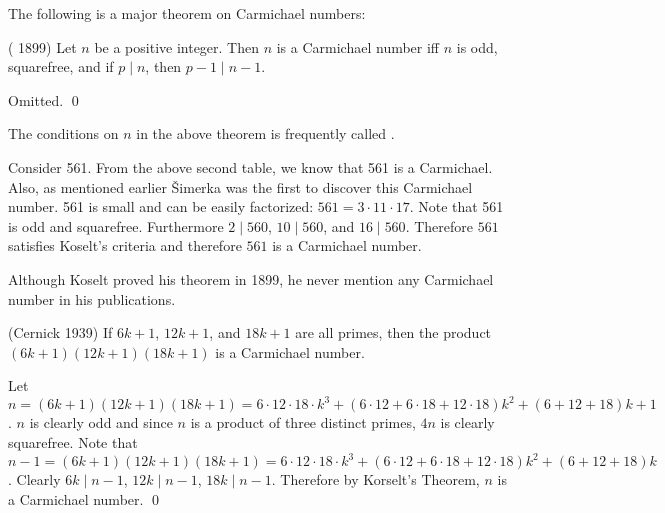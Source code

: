 



The following is a major theorem on Carmichael numbers:

\begin{thm} \textnormal{( 1899)}
  Let $n$ be a positive integer.
  Then $n$ is a Carmichael number iff $n$ is odd, squarefree, and
  if $p \mid n$, then $p-1 \mid n-1$.
\end{thm}
\proof
Omitted.
\qed

The conditions on $n$ in the above theorem is frequently called
.

\begin{eg}
Consider 561.
From the above second table, we know that 561 is a Carmichael.
Also, as mentioned earlier \v{S}imerka was the first to discover this
Carmichael number.
561 is small and can be easily factorized: $561 = 3 \cdot 11 \cdot 17$.
Note that 561 is odd and squarefree.
Furthermore $2 \mid 560$, $10 \mid 560$, and $16 \mid 560$.
Therefore $561$ satisfies Koselt's criteria and therefore
$561$ is a Carmichael number.
\end{eg}



Although Koselt proved his theorem in 1899,
he never mention any Carmichael number in his publications.

\begin{cor} \textnormal{(Cernick 1939)}\label{cor:cernick}
  If $6k + 1$, $12k + 1$, and $18k + 1$ are all primes, then the product
  $(6k + 1)(12k + 1)(18k + 1)$ is a Carmichael number.
\end{cor}
\proof
Let $n = (6k + 1)(12k + 1)(18k + 1) = 6 \cdot 12 \cdot 18 \cdot k^3
+ (6 \cdot 12 + 6 \cdot 18 + 12 \cdot 18)k^2
+ (6 + 12 + 18)k
+ 1$.
$n$ is clearly odd and since $n$ is a product of three distinct primes,
$4n$ is clearly squarefree.
Note that
$n - 1 = (6k + 1)(12k + 1)(18k + 1) = 6 \cdot 12 \cdot 18 \cdot k^3
+ (6 \cdot 12 + 6 \cdot 18 + 12 \cdot 18)k^2
+ (6 + 12 + 18)k$.
Clearly
$6k \mid n - 1$,
$12k \mid n - 1$,
$18k \mid n - 1$.
Therefore by Korselt's Theorem, $n$ is a Carmichael number.
\qed





